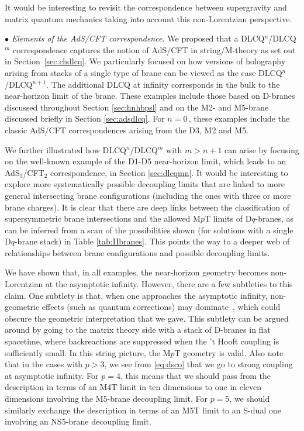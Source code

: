 \documentclass[11pt]{article}
\renewcommand{\emph}[1]{\textit{#1}}
\begin{document}
It would be interesting to revisit the correspondence between supergravity and matrix quantum mechanics taking into account this non-Lorentzian perspective. 

\vspace{3mm}
\noindent $\bullet$ \emph{Elements of the AdS/CFT correspondence.}
We proposed that a DLCQ${}^n$/DLCQ${}^m$ correspondence captures the notion of AdS/CFT in string/M-theory as set out in Section~\ref{sec:chdlcq}.
We particularly focused on how versions of holography arising from stacks of a single type of brane can be viewed as the case DLCQ${}^n$/DLCQ${}^{n+1}$.
The additional DLCQ at infinity corresponds in the bulk to the near-horizon limit of the brane.
These examples include those based on D-branes discussed throughout Section \ref{sec:hnhbpsl} and on the M2- and M5-brane discussed briefly in Section \ref{sec:adsdlcq}. 
For $n=0$\,, these examples include the classic AdS/CFT correspondences arising from the D3, M2 and M5. 

We further illustrated how DLCQ${}^n$/DLCQ${}^m$ with $m>n+1$ can arise by focusing on the well-known example of the D1-D5 near-horizon limit, which leads to an AdS${}_3$/CFT${}_2$ correspondence, in Section \ref{sec:dlcqmn}.
It would be interesting to explore more systematically possible decoupling limits that are linked to more general intersecting brane configurations (including the ones with three or more brane charges). 
It is clear that there are deep links between the classification of supersymmetric brane intersections and the allowed M$p$T limits of D$q$-branes, as can be inferred from a scan of the possibilities shown (for solutions with a single D$q$-brane stack) in Table \ref{tab:IIbranes}.
This points the way to a deeper web of relationships between brane configurations and possible decoupling limits.

We have shown that, in all examples, the near-horizon geometry becomes non-Lorentzian at the asymptotic infinity. However, there are a few subtleties to this claim. One subtlety is that, when one approaches the asymptotic infinity, non-geometric effects (such as quantum corrections) may dominate~\cite{Itzhaki:1998dd}, which could obscure the geometric interpretation that we gave. This subtlety can be argued around by going to the matrix theory side with a stack of D-branes in flat spacetime, where backreactions are suppressed when the 't Hooft coupling is sufficiently small. In this string picture, the M$p$T geometry is valid. 
Also note that in the cases with $p>3$, we see from \eqref{eq:dsco} that we go to strong coupling at asymptotic infinity.
For $p=4$, this means that we should pass from the description in terms of an M4T limit in ten dimensions to one in eleven dimensions involving the M5-brane decoupling limit. 
For $p=5$, we should similarly exchange the description in terms of an M5T limit to an S-dual one involving an NS5-brane decoupling limit.
\end{document}
